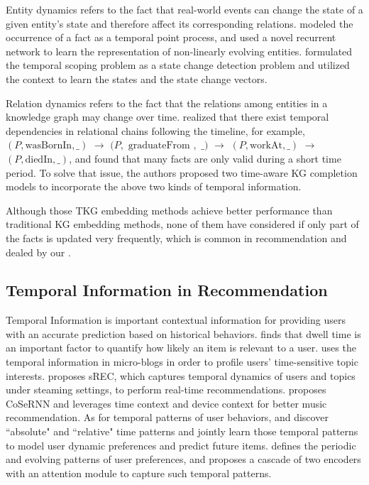 Entity dynamics refers to the fact that real-world events can
change the state of a given entity's state and therefore affect its
corresponding relations. 
%
\cite{knowevolve} modeled the occurrence of a fact as a
temporal point process, and used a novel recurrent network to learn the
representation of non-linearly evolving entities. 
%
\cite{contextTemporal} formulated the temporal scoping
problem as a state change detection problem and utilized the context to learn
the states and the state change vectors.

Relation dynamics refers to the fact that the relations
among entities in a knowledge graph may change over time. 
%
\cite{relation_dy} realized that there exist temporal
dependencies in relational chains following the timeline, for example,
$(P,\text{wasBornIn}, \_ )$ $ \rightarrow$ $ (P, $ $ \text{graduateFrom}$ $, $ $\_ ) $ $\rightarrow $ $(P, \text{workAt}, \_ ) $
$\rightarrow $ $(P,\text{diedIn}, \_ )$, and found that many facts are only
valid during a short time period. To solve that issue, the authors proposed two
time-aware KG completion models to incorporate the above two kinds of temporal
information.

Although those TKG embedding methods achieve better
performance than traditional KG embedding methods, 
none of them have considered if only part of the facts is updated very frequently, which is common in recommendation
and dealed by our \tkgrec.

\subsection{Temporal Information in Recommendation}

Temporal Information is important contextual information for providing users 
with an accurate prediction based on historical behaviors\cite{timeSurveyReview}.
\cite{yi2014beyond} finds that dwell time is an important factor to quantify how likely an item is relevant to a user.
\cite{liang2012time} uses the temporal information in micro-blogs in order to profile users' time-sensitive topic interests.
\cite{chang2017streaming} proposes sREC, which captures temporal dynamics of users and topics under steaming settings, to perform real-time recommendations.
\cite{seqInMusic} proposes CoSeRNN and leverages time context and device context for better music recommendation.
As for temporal patterns of user behaviors, \cite{timeMatters} and \cite{timeAwareSeq} discover ``absolute" and ``relative" time patterns and jointly learn those temporal patterns to model user dynamic preferences and predict future items.
\cite{heteTemporal} defines the periodic and evolving patterns of user preferences, and proposes a cascade of two encoders with an attention module to capture such temporal patterns.

